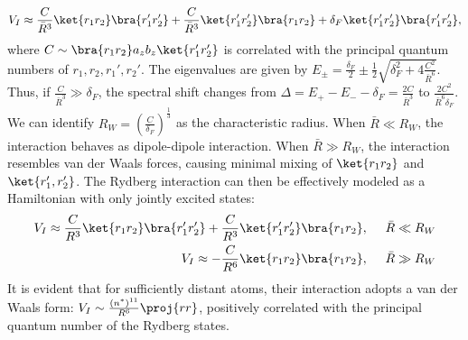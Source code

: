 \documentclass[11pt]{article}
\begin{document}
\begin{align}
    V_I \approx \frac{C}{\Bar{R}^3} \ket{r_1r_2} \bra{r_1' r_2'} + \frac{C}{\Bar{R}^3} \ket{r_1'r_2'} \bra{r_1 r_2} + \delta_F \ket{r_1'r_2'} \bra{r_1' r_2'},
\end{align}
where $C \sim \bra{r_1 r_2} a_zb_z \ket{r_1' r_2'}$ is correlated with the principal quantum numbers of $r_1, r_2, r_1', r_2'$. The eigenvalues are given by $E_{\pm} = \frac{\delta_F}{2} \pm \frac{1}{2}\sqrt{\delta_F^2 + 4 \frac{C^2}{\bar{R}^6} }$. Thus, if $\frac{C}{\bar{R}^3} \gg \delta_F$, the spectral shift changes from $\Delta = E_+ - E_- - \delta_F = \frac{2C}{\bar{R}^3}$ to $\frac{2C^2}{\bar{R}^6 \delta_F}$. We can identify $R_W = \left(\frac{C}{\delta_F}\right)^{\frac{1}{3}}$ as the characteristic radius. When $\bar{R} \ll R_W$, the interaction behaves as dipole-dipole interaction. When $\bar{R} \gg R_W$, the interaction resembles van der Waals forces, causing minimal mixing of $\ket{r_1r_2}$ and $\ket{r_1',r_2'}$. The Rydberg interaction can then be effectively modeled as a Hamiltonian with only jointly excited states:
\begin{align}
     V_{I} \approx \frac{C}{R^3} \ket{r_1r_2} \bra{r_1' r_2'} + \frac{C}{R^3} \ket{r_1'r_2'} \bra{r_1 r_2}  ,\ \ \ \ \Bar{R} \ll R_W \\
     V_{I} \approx  -\frac{C}{R^6} \ket{r_1r_2} \bra{r_1 r_2}  ,\ \ \ \ \Bar{R} \gg R_W
\end{align}
It is evident that for sufficiently distant atoms, their interaction adopts a van der Waals form: $V_I \sim \frac{(n^*)^{11}}{R^6}\proj{rr}$, positively correlated with the principal quantum number of the Rydberg states.
\end{document}
